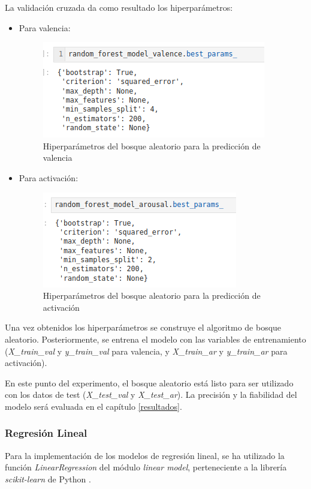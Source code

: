 \documentclass[12pt,a4paper]{article}
\begin{document}
La validación cruzada da como resultado los hiperparámetros:
\begin{itemize}
	\item Para valencia:
	\begin{figure}[H]
		\centering
		\includegraphics[width=0.7\linewidth]{figs/final_params_random_forest_valence}
		\caption{Hiperparámetros del bosque aleatorio para la predicción de valencia}
		\label{fig:finalparamsrandomforestvalence}
	\end{figure}
	\item Para activación:
	\begin{figure}[H]
		\centering
		\includegraphics[width=0.7\linewidth]{figs/final_params_random_forest_arousal}
		\caption{Hiperparámetros del bosque aleatorio para la predicción de activación}
		\label{fig:finalparamsrandomforestarousal}
	\end{figure}
\end{itemize}

Una vez obtenidos los hiperparámetros se construye el algoritmo de bosque aleatorio. Posteriormente, se entrena el modelo con las variables de entrenamiento (\textit{X\_train\_val} y \textit{y\_train\_val} para valencia, y \textit{X\_train\_ar} y \textit{y\_train\_ar} para activación).


En este punto del experimento, el bosque aleatorio está listo para ser utilizado con los datos de test (\textit{X\_test\_val} y \textit{X\_test\_ar}). La precisión y la fiabilidad del modelo será evaluada en el capítulo \ref{resultados}.

\subsubsection{Regresión Lineal}
Para la implementación de los modelos de regresión lineal, se ha utilizado la función \textit{LinearRegression} del módulo \textit{linear model}, perteneciente a la librería \textit{scikit-learn} de Python \cite{scikit-learn}.
\end{document}
